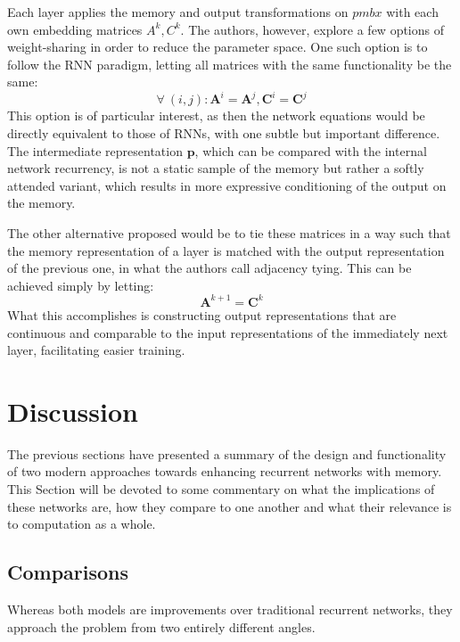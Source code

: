 \documentclass[]{article}
\begin{document}
Each layer applies the memory and output transformations on $pmb{x}$ with each own embedding matrices $A^k, C^k$. The authors, however, explore a few options of weight-sharing in order to reduce the parameter space. One such option is to follow the RNN paradigm, letting all matrices with the same functionality be the same:
\[
\tag{RNN-Tying}
\forall \ (i,j): \pmb{A}^i = \pmb{A}^j, \pmb{C}^i = \pmb{C}^j
\]
This option is of particular interest, as then the network equations would be directly equivalent to those of RNNs, with one subtle but important difference. The intermediate representation $\pmb{p}$, which can be compared with the internal network recurrency, is not a static sample of the memory but rather a softly attended variant, which results in more expressive conditioning of the output on the memory. 

The other alternative proposed would be to tie these matrices in a way such that the memory representation of a layer is matched with the output representation of the previous one, in what the authors call adjacency tying. This can be achieved simply by letting:
\[
\tag{Adjacency Tying}
\pmb{A}^{k+1} = \pmb{C}^k
\]
What this accomplishes is constructing output representations that are continuous and comparable to the input representations of the immediately next layer, facilitating easier training.

\section{Discussion}
\label{Comp}
The previous sections have presented a summary of the design and functionality of two modern approaches towards enhancing recurrent networks with memory. This Section will be devoted to some commentary on what the implications of these networks are, how they compare to one another and what their relevance is to computation as a whole.

\subsection{Comparisons}
Whereas both models are improvements over traditional recurrent networks, they approach the problem from two entirely different angles. 
\end{document}
